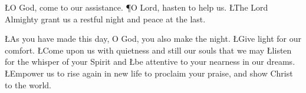 \documentclass[11pt]{article}
\begin{document}



\begin{Litany}
\L{O God, come to our assistance.}
\P{O Lord, hasten to help us.}
\L{The Lord Almighty grant us a restful night and peace at the last.}
\Amen
\end{Litany}





\Silence




\begin{Litany}
\L{As you have made this day, O God, you also make the night.}
\L{Give light for our comfort.}
  \L{Come upon us with quietness and still our souls that we may}
\Indent\L{listen for the
  whisper of your Spirit and}
\Indent\L{be attentive to your nearness in our dreams.}
\L{Empower us to rise again in new life to proclaim your praise, and show
  Christ to the world.}
\Amen
\end{Litany}




\end{document}
